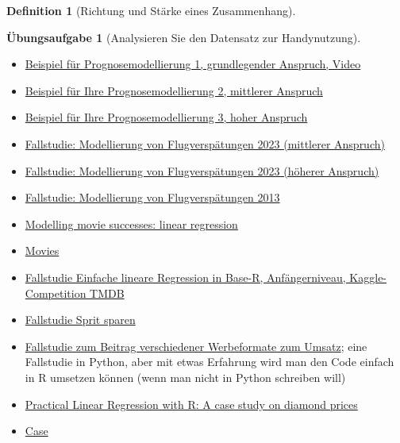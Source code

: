 \documentclass[
  a4paper,
  DIV=11]{scrreprt}
\theoremstyle{definition}
\newtheorem{exercise}{Übungsaufgabe}[chapter]
\theoremstyle{definition}
\theoremstyle{definition}
\newtheorem{definition}{Definition}[chapter]
\theoremstyle{remark}
\begin{document}
\begin{definition}[Richtung und Stärke eines
Zusammenhang]
\begin{exercise}[Analysieren Sie den Datensatz zur
Handynutzung]
\begin{itemize}
\item
  \href{https://youtu.be/5pBTHrnRIZY}{Beispiel für Prognosemodellierung
  1, grundlegender Anspruch, Video}
\item
  \href{https://data-se.netlify.app/2020/11/13/fallstudie-zur-regressionsanalyse-ggplot2movies/}{Beispiel
  für Ihre Prognosemodellierung 2, mittlerer Anspruch}
\item
  \href{https://data-se.netlify.app/2021/03/10/fallstudie-modellierung-von-flugversp\%C3\%A4tungen/}{Beispiel
  für Ihre Prognosemodellierung 3, hoher Anspruch}
\item
  \href{https://datenwerk.netlify.app/posts/flights-delay/}{Fallstudie:
  Modellierung von Flugverspätungen 2023 (mittlerer Anspruch)}
\item
  \href{https://datenwerk.netlify.app/posts/flights-delay/}{Fallstudie:
  Modellierung von Flugverspätungen 2023 (höherer Anspruch)}
\item
  \href{https://data-se.netlify.app/2021/03/10/fallstudie-modellierung-von-flugversp\%C3\%A4tungen/}{Fallstudie:
  Modellierung von Flugverspätungen 2013}
\item
  \href{https://data-se.netlify.app/2021/02/24/modelling-movie-successes-linear-regression/}{Modelling
  movie successes: linear regression}
\item
  \href{https://data-se.netlify.app/2020/11/13/fallstudie-zur-regressionsanalyse-ggplot2movies/}{Movies}
\item
  \href{https://www.kaggle.com/code/ssauer/tmdb-simple-regression-beginners}{Fallstudie
  Einfache lineare Regression in Base-R, Anfängerniveau,
  Kaggle-Competition TMDB}
\item
  \href{https://data-se.netlify.app/2022/05/02/fallstudie-spritverbrauch/}{Fallstudie
  Sprit sparen}
\item
  \href{https://www.kaggle.com/code/saikatkumardey/linear-regression-case-study/notebook}{Fallstudie
  zum Beitrag verschiedener Werbeformate zum Umsatz}; eine Fallstudie in
  Python, aber mit etwas Erfahrung wird man den Code einfach in R
  umsetzen können (wenn man nicht in Python schreiben will)
\item
  \href{https://www.linkedin.com/pulse/practical-linear-regression-r-case-study-diamond-prices-valdeleon/?trk=public_profile_article_view}{Practical
  Linear Regression with R: A case study on diamond prices}
\item
  \href{https://stat-ata-asu.github.io/MultipleAndLogisticRegression/case-study-italian-restaurants-in-nyc.html}{Case
}
\end{itemize}
\end{exercise}
\end{definition}
\end{document}
